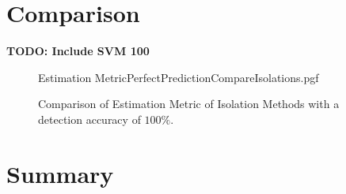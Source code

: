%	

\section{Comparison}
\textbf{TODO: Include SVM 100}
\begin{figure}[!htb]
	\centering
	{Estimation MetricPerfectPredictionCompareIsolations.pgf}
	
	\caption{Comparison of Estimation Metric of Isolation Methods with a detection accuracy of $100\%$.}
	\label{fig:IsolationMethodsWithPerfectPrediction}
\end{figure}

\section{Summary}